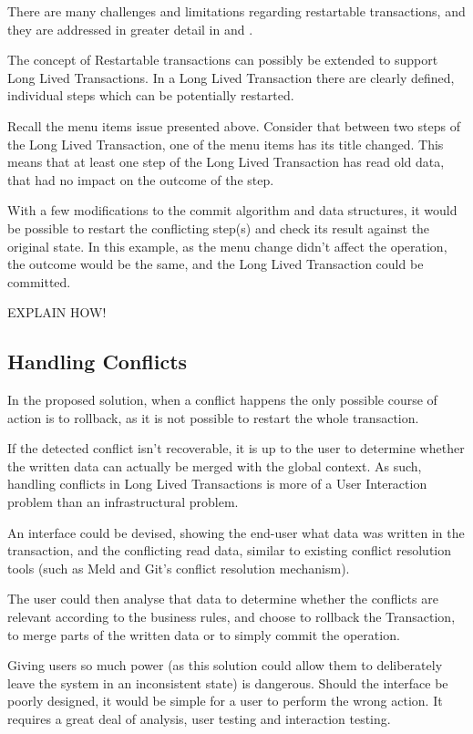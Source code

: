 There are many challenges and limitations regarding restartable
transactions, and they are addressed in greater detail in
\cite{cachopo2006versioned} and \cite{BrunoJorgeGasparFranco2013}.

The concept of Restartable transactions can possibly be extended to
support Long Lived Transactions. In a Long Lived Transaction there are
clearly defined, individual steps which can be potentially restarted.

Recall the menu items issue presented above. Consider that between two
steps of the Long Lived Transaction, one of the menu items has its
title changed. This means that at least one step of the Long Lived
Transaction has read old data, that had no impact on the outcome of
the step.

With a few modifications to the commit algorithm and data structures,
it would be possible to restart the conflicting step(s) and check its
result against the original state. In this example, as the menu change
didn't affect the operation, the outcome would be the same, and the
Long Lived Transaction could be committed.

EXPLAIN HOW!


\subsection{Handling Conflicts}

In the proposed solution, when a conflict happens the only possible
course of action is to rollback, as it is not possible to restart the
whole transaction.

If the detected conflict isn't recoverable, it is up to the user to
determine whether the written data can actually be merged with the
global context. As such, handling conflicts in Long Lived Transactions
is more of a User Interaction problem than an infrastructural problem.

An interface could be devised, showing the end-user what data was
written in the transaction, and the conflicting read data, similar to
existing conflict resolution tools (such as Meld and Git's conflict
resolution mechanism).

The user could then analyse that data to determine whether the
conflicts are relevant according to the business rules, and choose to
rollback the Transaction, to merge parts of the written data or to
simply commit the operation.

Giving users so much power (as this solution could allow them to
deliberately leave the system in an inconsistent state) is
dangerous. Should the interface be poorly designed, it would be simple
for a user to perform the wrong action. It requires a great deal of
analysis, user testing and interaction testing.

